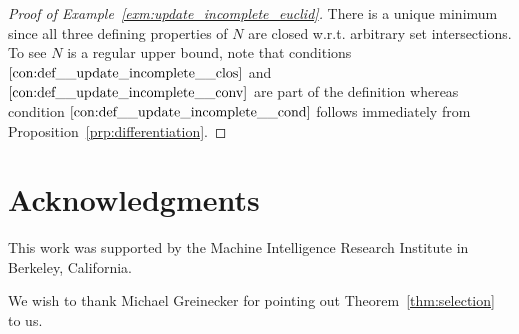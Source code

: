 \documentclass[11pt]{article}
\theoremstyle{definition}
\theoremstyle{plain}
\begin{document}
\begin{proof}[Proof of Example~\ref{exm:update_incomplete_euclid}]
There is a unique minimum since all three defining properties of $N$ are closed w.r.t. arbitrary set intersections. To see $N$ is a regular upper bound, note that conditions $\ref{con:def__update_incomplete__clos}$ and $\ref{con:def__update_incomplete__conv}$ are part of the definition whereas condition $\ref{con:def__update_incomplete__cond}$ follows immediately from Proposition~\ref{prp:differentiation}.
\end{proof}

\section*{Acknowledgments}

This work was supported by the Machine Intelligence Research Institute in Berkeley, California.

We wish to thank Michael Greinecker for pointing out Theorem~\ref{thm:selection} to us.



\end{document}
